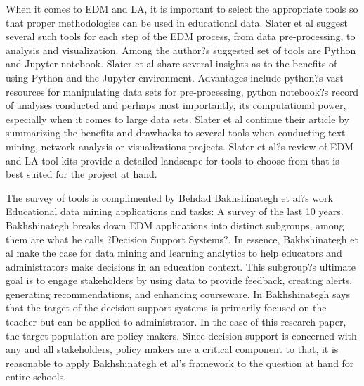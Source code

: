 \documentclass[12pt,a4paper]{article}
\begin{document}
When it comes to EDM and LA, it is important to select the appropriate tools so that proper methodologies can be used in educational data. Slater et al suggest several such tools for each step of the EDM process, from data pre-processing, to analysis and visualization. Among the author?s suggested set of tools are Python and Jupyter notebook. Slater et al share several insights as to the benefits of using Python and the Jupyter environment. Advantages include python?s vast resources for manipulating data sets for pre-processing, python notebook?s record of analyses conducted and perhaps most importantly, its computational power, especially when it comes to large data sets. Slater et al continue their article by summarizing the benefits and drawbacks to several tools when conducting text mining, network analysis or visualizations projects. Slater et al?s review of EDM and LA tool kits provide a detailed landscape for tools to choose from that is best suited for the project at hand.

The survey of tools is complimented by Behdad Bakhshinategh et al?s work Educational data mining applications and tasks: A survey of the last 10 years. Bakhshinategh breaks down EDM applications into distinct subgroups, among them are what he calls ?Decision Support Systems?. In essence, Bakhshinategh et al make the case for data mining and learning analytics to help educators and administrators make decisions in an education context. This subgroup?s ultimate goal is to engage stakeholders by using data to provide feedback, creating alerts, generating recommendations, and enhancing courseware. In Bakhshinategh says that the target of the decision support systems is primarily focused on the teacher but can be applied to administrator. In the case of this research paper, the target population are policy makers. Since decision support is concerned with any and all stakeholders, policy makers are a critical component to that, it is reasonable to apply Bakhshinategh et al's framework to the question at hand for entire schools. 
\end{document}
